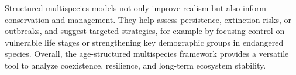 \documentclass[10pt, a4paper]{amsart}
\theoremstyle{plain}
\theoremstyle{definition}
\theoremstyle{remark}
\numberwithin{equation}{section}
\begin{document}
Structured multispecies models not only improve realism but also inform conservation and management. They help assess persistence, extinction risks, or outbreaks, and suggest targeted strategies, for example by focusing control on vulnerable life stages or strengthening key demographic groups in endangered species. Overall, the age-structured multispecies framework provides a versatile tool to analyze coexistence, resilience, and long-term ecosystem stability.
\end{document}
